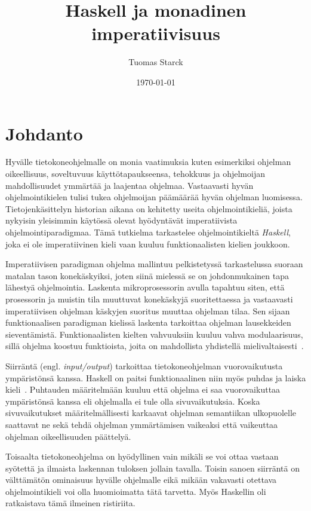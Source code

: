 \documentclass[finnish]{tktltiki2}
\title{Haskell ja monadinen imperatiivisuus}
\author{Tuomas Starck}
\date{\today}
\begin{document}
\frontmatter

\maketitle
\makeabstract

\tableofcontents

\mainmatter

\newcommand{\arr}[0]{\rightarrow}
\newcommand{\code}[1]{\texttt{#1}}


\section{Johdanto}

Hyvälle tietokoneohjelmalle on monia vaatimuksia kuten esimerkiksi ohjelman oikeellisuus,
soveltuvuus käyttötapaukseensa, tehokkuus ja ohjelmoijan mahdollisuudet ymmärtää ja laajentaa ohjelmaa.
Vastaavasti hyvän ohjelmointikielen tulisi tukea ohjelmoijan päämäärää hyvän ohjelman luomisessa.
Tietojenkäsittelyn historian aikana on kehitetty useita ohjelmointikieliä, joista nykyisin
yleisimmin käytössä olevat hyödyntävät imperatiivista ohjelmointiparadigmaa. Tämä tutkielma
tarkastelee ohjelmointikieltä \emph{Haskell}, joka ei ole imperatiivinen kieli vaan kuuluu
funktionaalisten kielien joukkoon.

Imperatiivisen paradigman ohjelma mallintuu pelkistetyssä tarkastelussa suoraan matalan tason
konekäskyiksi, joten siinä mielessä se on johdonmukainen tapa lähestyä ohjelmointia. Laskenta
mikroprosessorin avulla tapahtuu siten, että prosessorin ja muistin tila muuttuvat konekäskyjä
suoritettaessa ja vastaavasti imperatiivisen ohjelman käskyjen suoritus muuttaa ohjelman tilaa. Sen
sijaan funktionaalisen paradigman kielissä laskenta tarkoittaa ohjelman lausekkeiden sieventämistä.
Funktionaalisten kielten vahvuuksiin kuuluu vahva modulaarisuus, sillä ohjelma koostuu funktioista,
joita on mahdollista yhdistellä mielivaltaisesti~\cite{why90}.

Siirräntä (engl. \emph{input/output}) tarkoittaa tietokoneohjelman vuorovaikutusta ympäristönsä
kanssa. Haskell on paitsi funktionaalinen niin myös puhdas ja laiska kieli~\cite{rep92}. Puhtauden
määritelmään kuuluu että ohjelma ei saa vuorovaikuttaa ympäristönsä kanssa eli ohjelmalla ei tule
olla sivuvaikutuksia. Koska sivuvaikutukset määritelmällisesti karkaavat ohjelman semantiikan
ulkopuolelle saattavat ne sekä tehdä ohjelman ymmärtämisen vaikeaksi että vaikeuttaa ohjelman
oikeellisuuden päättelyä.

Toisaalta tietokoneohjelma on hyödyllinen vain mikäli se voi ottaa vastaan syötettä ja ilmaista
laskennan tuloksen jollain tavalla. Toisin sanoen siirräntä on välttämätön ominaisuus hyvälle
ohjelmalle eikä mikään vakavasti otettava ohjelmointikieli voi olla huomioimatta tätä tarvetta. Myös
Haskellin oli ratkaistava tämä ilmeinen ristiriita.
\end{document}
